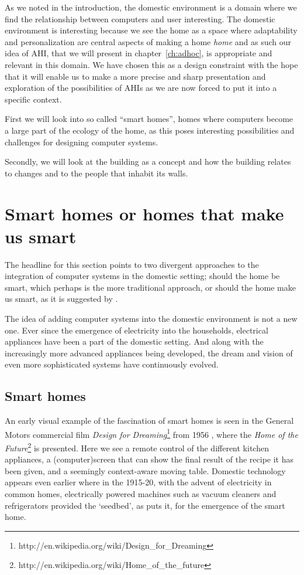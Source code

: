 As we noted in the introduction, the domestic environment is a domain where we find the relationship between computers and user interesting.
The domestic environment is interesting because we see the home as a space where adaptability and personalization are central aspects of making a home \emph{home} and as such our idea of AHI, that we will present in chapter~\ref{ch:adhoc}, is appropriate and relevant in this domain.
We have chosen this as a design constraint with the hope that it will enable us to make a more precise and sharp presentation and exploration of the possibilities of AHIs as we are now forced to put it into a specific context.

First we will look into so called ``smart homes'', homes where computers become a large part of the ecology of the home, as this poses interesting possibilities and challenges for designing computer systems.

Secondly, we will look at the building as a concept and how the building relates to changes and to the people that inhabit its walls.

\section{Smart homes or homes that make us smart}
The headline for this section points to two divergent approaches to the integration of computer systems in the domestic setting; should the home be smart, which perhaps is the more traditional approach, or should the home make us smart, as it is suggested by \citet{taylor2007homes}.

The idea of adding computer systems into the domestic environment is not a new one.
Ever since the emergence of electricity into the households, electrical appliances have been a part of the domestic setting.
And along with the increasingly more advanced appliances being developed, the dream and vision of even more sophisticated systems have continuously evolved.

\subsection{Smart homes}
An early visual example of the fascination of smart homes is seen in the General Motors commercial film \emph{Design for Dreaming}\footnote{http://en.wikipedia.org/wiki/Design\_for\_Dreaming} from 1956 \citep{designfordreaming}, where the \emph{Home of the Future}\footnote{http://en.wikipedia.org/wiki/Home\_of\_the\_future} is presented.
Here we see a remote control of the different kitchen appliances, a (computer)screen that can show the final result of the recipe it has been given, and a seemingly context-aware moving table.
Domestic technology appears even earlier where in the 1915-20, with the advent of electricity in common homes, electrically powered machines such as vacuum cleaners and refrigerators provided the `seedbed', as \citet{aldrich2003smart} puts it, for the emergence of the smart home.

